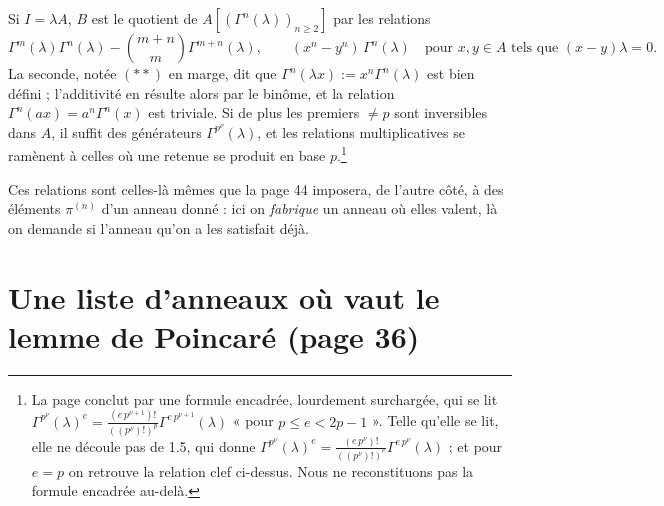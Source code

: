 \documentclass[11pt,a4paper]{article}
\begin{document}
Si $I = \lambda A$, $B$ est le quotient de $A[(\Gamma^{n}(\lambda))_{n
\geqslant 2}]$ par les relations
\[
\Gamma^{m}(\lambda)\Gamma^{n}(\lambda) - \binom{m+n}{m}\Gamma^{m+n}(\lambda),
\qquad (x^{n} - y^{n})\,\Gamma^{n}(\lambda) \quad \text{pour } x, y \in A
\text{ tels que } (x-y)\lambda = 0 .
\]
La seconde, notée $(**)$ en marge, dit que $\Gamma^{n}(\lambda x) :=
x^{n}\Gamma^{n}(\lambda)$ est bien défini ; l'additivité en résulte alors
par le binôme, et la relation $\Gamma^{n}(ax) = a^{n}\Gamma^{n}(x)$ est
triviale. Si de plus les premiers $\neq p$ sont inversibles dans $A$, il
suffit des générateurs $\Gamma^{p^{\nu}}(\lambda)$, et les relations
multiplicatives se ramènent à celles où une retenue se produit en base
$p$.\footnote{La page conclut par une formule encadrée, lourdement
surchargée, qui se lit $\Gamma^{p^{\nu}}(\lambda)^{e} =
\frac{(e\,p^{\nu+1})!}{((p^{\nu})!)^{p}}\Gamma^{e\,p^{\nu+1}}(\lambda)$
« pour $p \leqslant e < 2p-1$ ». Telle qu'elle se lit, elle ne découle pas
de 1.5, qui donne $\Gamma^{p^{\nu}}(\lambda)^{e} =
\frac{(e\,p^{\nu})!}{((p^{\nu})!)^{e}}\Gamma^{e\,p^{\nu}}(\lambda)$ ; et pour
$e = p$ on retrouve la relation clef ci-dessus. Nous ne reconstituons pas la
formule encadrée au-delà.}

Ces relations sont celles-là mêmes que la page 44 imposera, de l'autre côté,
à des éléments $\pi^{(n)}$ d'un anneau donné : ici on \emph{fabrique} un
anneau où elles valent, là on demande si l'anneau qu'on a les satisfait déjà.

\section*{Une liste d'anneaux où vaut le lemme de Poincaré (page 36)}
\end{document}
